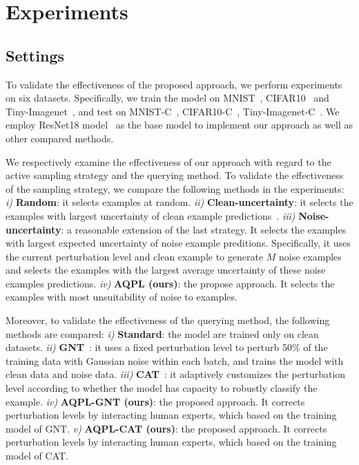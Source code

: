 \documentclass[letterpaper]{article} %
\begin{document}
\section{Experiments}

\subsection{Settings}
To validate the effectiveness of the proposed approach, we perform experiments on six datasets. Specifically, we train the model on MNIST~\cite{lecun1998gradient}, CIFAR10~\cite{krizhevsky2009learning} and Tiny-Imagenet~\cite{yao2015tiny}, and test on MNIST-C~\cite{mu2019mnist}, CIFAR10-C~\cite{hendrycks2019robustness}, Tiny-Imagenet-C~\cite{hendrycks2019robustness}.
We employ ResNet18 model~\cite{he2016deep} as the base model to implement our approach as well as other compared methods.

We respectively examine the effectiveness of our approach with regard to the active sampling strategy and the querying method. To validate the effectiveness of the sampling strategy, we compare the following methods in the experiments:
\emph{i)} \textbf{Random}: it selects examples at random.
\emph{ii)} \textbf{Clean-uncertainty}: it selects the examples with largest uncertainty of clean example predictions~\cite{lewis1994sequential}.
\emph{iii)} \textbf{Noise-uncertainty}: a reasonable extension of the last strategy. It selects the examples with largest expected uncertainty of noise example preditions. Specifically, it uses the current perturbation level and clean example to generate $M$ noise examples and selects the examples with the largest average uncertainty of these noise examples predictions.
\emph{iv)} \textbf{AQPL (ours)}: the propose approach. It selects the examples with most unsuitability of noise to examples.

Moreover, to validate the effectiveness of the querying method, the following methods are compared:
\emph{i)} \textbf{Standard}: the model are trained only on clean datasets.
\emph{ii)} \textbf{GNT}~\cite{rusak2020increasing}: it uses a fixed perturbation level to perturb 50\% of the training data with  Gaussian noise within each batch, and trains the model with clean data and noise data.
\emph{iii)} \textbf{CAT}~\cite{cheng2020cat}: it adaptively customizes the perturbation level according to whether the model has capacity to robustly classify the example.
\emph{iv)} \textbf{AQPL-GNT (ours)}: the proposed approach. It corrects perturbation levels by interacting human experts, which based on the training model of GNT.
\emph{v)} \textbf{AQPL-CAT (ours)}: the proposed approach. It corrects perturbation levels by interacting human experts, which based on the training model of CAT.
\end{document}

